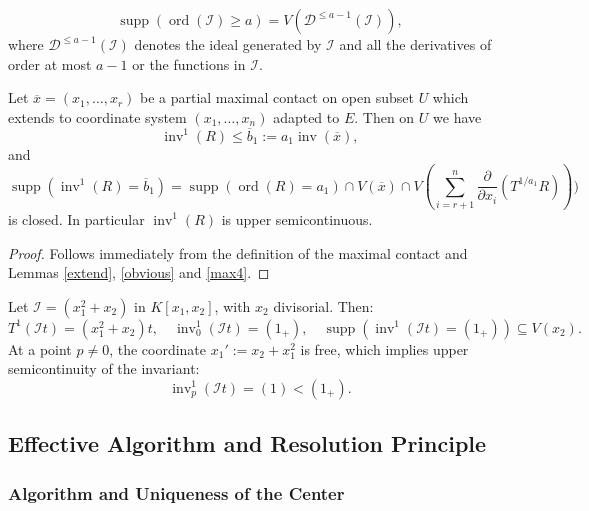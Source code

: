 \documentclass{amsart}
\renewcommand{\cD}{{\mathcal D}}
\newcommand{\cI}{{\mathcal I}}
\renewcommand{\setminus}{\smallsetminus}
\newcommand{\ord}{{\operatorname{ord}}}
\newcommand{\inv}{{\operatorname{inv}}}
\def\supp{{\operatorname{supp}}}
\begin{document}
\[
\supp\left(\ord(\cI) \geq a\right) = V\left(\cD^{\leq a-1}(\cI)\right),
\]
where $\cD^{\leq a-1}(\cI)$ denotes the ideal generated by $\cI$ and all the derivatives of order at most $a-1$ or the functions in $\cI$.
\begin{lemma} \label{Giraud2}
Let $\overline{x}=(x_1,\ldots,x_r)$ be a partial maximal contact on open subset $U$ which extends to coordinate system $(x_1,\ldots,x_n)$ adapted to $E$. Then on $U$  we have $$\inv^1(R)\leq \overline{b}_1:=a_1\inv(\overline{x}),$$ and 
\[
\supp (\inv^1(R)= \overline{b}_1) = \supp(\ord(R)= a_1) \cap V(\overline{x})\cap V(\sum^n_{i=r+1}\frac{\partial}{\partial x_i}(T^{1/a_1}R)))\]
is closed. In particular $\inv^1(R)$ is upper semicontinuous.
\end{lemma}
\begin{proof} Follows immediately from the definition of the maximal contact and Lemmas \ref{extend}, \ref{obvious} and  \ref{max4}.
\end{proof}


\begin{example}
Let $\cI = (x_1^2 + x_2)$ in $K[x_1, x_2]$, with $x_2$ divisorial. Then:
\[
T^1(\cI t) = (x_1^2 + x_2)t, \quad \inv^1_0(\cI t) = (1_+), \quad \supp (\inv^1(\cI t)=(1_+)) \subseteq V(x_2).
\]
At a point $p \neq 0$, the coordinate $x_1' := x_2 + x_1^2$ is free, which implies upper semicontinuity of the invariant:
\[
\inv^1_p(\cI t) = (1) < (1_+).
\]
\end{example}

 \subsection{Effective Algorithm  and Resolution Principle}\label{algo1}


\subsubsection{Algorithm and  Uniqueness of the Center}\label{algo}
\end{document}
